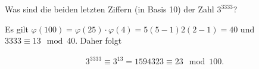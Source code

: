 
\begin{exercise}

Was sind die beiden letzten Ziffern (in Basis 10) der Zahl $3^{3333}$?

\end{exercise}


\begin{solution}

Es gilt $\varphi(100) = \varphi(25) \cdot \varphi(4) = 5(5-1)2(2-1) = 40$
und $3333 \equiv 13 \mod{40}$. Daher folgt

\begin{align*}
    3^{3333} \equiv 3^{13} = 1594323 \equiv 23 \mod{100}.
\end{align*}

\end{solution}

